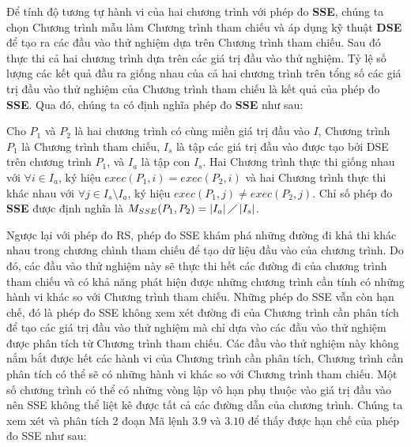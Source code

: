 Để tính độ tương tự hành vi của hai chương trình với phép đo \textbf{SSE}, chúng ta chọn Chương trình mẫu làm Chương trình tham chiếu và áp dụng kỹ thuật \textbf{DSE} để tạo ra các đầu vào thử nghiệm dựa trên Chương trình tham chiếu. Sau đó thực thi cả hai chương trình dựa trên các giá trị đầu vào thử nghiệm. Tỷ lệ số lượng các kết quả đầu ra giống nhau của cả hai chương trình trên tổng số các giá trị đầu vào thử nghiệm của Chương trình tham chiếu là kết quả của phép đo \textbf{SSE}. Qua đó, chúng ta có định nghĩa phép đo \textbf{SSE} như sau:

\begin{definition}
	Cho $P_{1}$ và $P_{2}$ là hai chương trình có cùng miền giá trị đầu vào $I$, Chương trình $P_{1}$ là Chương trình tham chiếu, $I_{s}$ là tập các giá trị đầu vào được tạo bởi DSE trên chương trình $P_{1}$, và $I_{a}$ là tập con $I_{s}$. Hai Chương trình thực thi giống nhau với $\forall i \in I_{a}$, ký hiệu $exec(P_{1}, i) = exec(P_{2}, i)$ và hai Chương trình thực thi khác nhau với $\forall j \in I_{s} \setminus I_{a}$, ký hiệu $exec(P_{1}, j) \neq exec(P_{2}, j)$. Chỉ số phép đo \textbf{SSE} được định nghĩa là $M_{SSE}(P_{1}, P_{2}) = \left|I_{a}\right| \diagup \left|I_{s}\right| $.
\end{definition}

Ngược lại với phép đo RS, phép đo SSE khám phá những đường đi khả thi khác nhau trong chương chình tham chiếu để tạo dữ liệu đầu vào của chương trình. Do đó, các đầu vào thử nghiệm này sẽ thực thi hết các đường đi của chương trình tham chiếu và có khả năng phát hiện được những chương trình cần tính có những hành vi khác so với Chương trình tham chiếu. Những phép đo SSE vẫn còn hạn chế, đó là phép đo SSE không xem xét đường đi của Chương trình cần phân tích để tạo các giá trị đầu vào thử nghiệm mà chỉ dựa vào các đầu vào thử nghiệm được phân tích từ Chương trình tham chiếu. Các đầu vào thử nghiệm này không nắm bắt được hết các hành vi của Chương trình cần phân tích, Chương trình cần phân tích có thể sẽ có những hành vi khác so với Chương trình tham chiếu. Một số chương trình có thể có những vòng lập vô hạn phụ thuộc vào giá trị đầu vào nên SSE không thể liệt kê được tất cả các đường dẫn của chương trình. Chúng ta xem xét và phân tích 2 đoạn Mã lệnh $3.9$ và $3.10$ để thấy được hạn chế của phép đo SSE như sau:

\begin{minipage}[t]{0.45\linewidth}
	
\end{minipage}%
\hfill\vrule\hfill
\begin{minipage}[t]{0.45\linewidth}
	
\end{minipage}%

